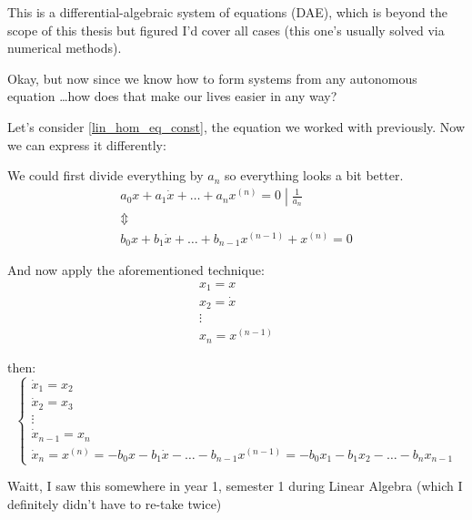 This is a differential-algebraic system of equations (DAE), which is beyond the scope of this thesis but figured I'd cover all cases (this one's usually solved via numerical methods).

Okay, but now since we know how to form systems from any autonomous equation \dots how does that make our lives easier in any way?

Let's consider \ref{lin_hom_eq_const}, the equation we worked with previously. Now we can express it differently:

We could first divide everything by $a_{n}$ so everything looks a bit better.
\begin{gather*}
				\left. a_0 x + a_1\dot{x}+ \dots +a_{n} x^{(n)} = 0 \middle| \frac{1}{a_{n}} \right. \\
				\Updownarrow \\
				b_0 x + b_1\dot{x} + \dots + b_{n-1} x^{(n-1)} + x^{(n)} = 0
\end{gather*}

And now apply the aforementioned technique:
\begin{gather*}
				x_1 = x     \\
				x_2 = \dot{x} \\
				\vdots \\
				x_n = x^{(n-1)}
\end{gather*}

then:
\[
				\begin{cases}
								\dot{x}_1 = x_2     \\
								\dot{x}_2 = x_3     \\
								\vdots              \\
								\dot{x}_{n-1} = x_n \\
								\dot{x}_n  = x^{(n)} = -b_0x - b_1\dot{x} - \dots - b_{n-1} x^{(n-1)} = -b_0 x_1 - b_1 x_2 - \dots - b_n x_{n-1}
				\end{cases}
\]

Waitt, I saw this somewhere in year 1, semester 1 during Linear Algebra (which I definitely didn't have to re-take twice)


